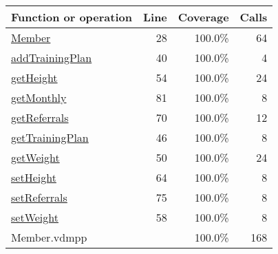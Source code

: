 \bigskip
\begin{longtable}{|l|r|r|r|}
\hline
Function or operation & Line & Coverage & Calls \\
\hline
\hline
\hyperref[Member:28]{Member} & 28&100.0\% & 64 \\
\hline
\hyperref[addTrainingPlan:40]{addTrainingPlan} & 40&100.0\% & 4 \\
\hline
\hyperref[getHeight:54]{getHeight} & 54&100.0\% & 24 \\
\hline
\hyperref[getMonthly:81]{getMonthly} & 81&100.0\% & 8 \\
\hline
\hyperref[getReferrals:70]{getReferrals} & 70&100.0\% & 12 \\
\hline
\hyperref[getTrainingPlan:46]{getTrainingPlan} & 46&100.0\% & 8 \\
\hline
\hyperref[getWeight:50]{getWeight} & 50&100.0\% & 24 \\
\hline
\hyperref[setHeight:64]{setHeight} & 64&100.0\% & 8 \\
\hline
\hyperref[setReferrals:75]{setReferrals} & 75&100.0\% & 8 \\
\hline
\hyperref[setWeight:58]{setWeight} & 58&100.0\% & 8 \\
\hline
\hline
Member.vdmpp & & 100.0\% & 168 \\
\hline
\end{longtable}


